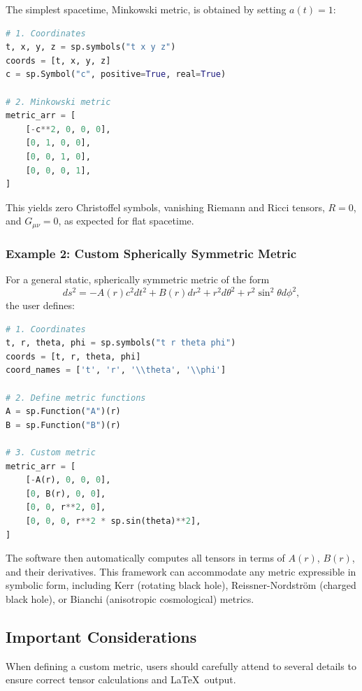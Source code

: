 \documentclass[11pt,a4paper]{article}
\begin{document}
The simplest spacetime, Minkowski metric, is obtained by setting $a(t) = 1$:

\begin{lstlisting}[language=Python]
# 1. Coordinates
t, x, y, z = sp.symbols("t x y z")
coords = [t, x, y, z]
c = sp.Symbol("c", positive=True, real=True)

# 2. Minkowski metric
metric_arr = [
    [-c**2, 0, 0, 0],
    [0, 1, 0, 0],
    [0, 0, 1, 0],
    [0, 0, 0, 1],
]
\end{lstlisting}

This yields zero Christoffel symbols, vanishing Riemann and Ricci tensors, $R = 0$, and $G_{\mu\nu} = 0$, as expected for flat spacetime.

\subsubsection*{Example 2: Custom Spherically Symmetric Metric}

For a general static, spherically symmetric metric of the form
\begin{equation}
ds^2 = -A(r) c^2 dt^2 + B(r) dr^2 + r^2 d\theta^2 + r^2 \sin^2\theta d\phi^2,
\end{equation}
the user defines:

\begin{lstlisting}[language=Python]
# 1. Coordinates
t, r, theta, phi = sp.symbols("t r theta phi")
coords = [t, r, theta, phi]
coord_names = ['t', 'r', '\\theta', '\\phi']

# 2. Define metric functions
A = sp.Function("A")(r)
B = sp.Function("B")(r)

# 3. Custom metric
metric_arr = [
    [-A(r), 0, 0, 0],
    [0, B(r), 0, 0],
    [0, 0, r**2, 0],
    [0, 0, 0, r**2 * sp.sin(theta)**2],
]
\end{lstlisting}

The software then automatically computes all tensors in terms of $A(r)$, $B(r)$, and their derivatives. This framework can accommodate any metric expressible in symbolic form, including Kerr (rotating black hole), Reissner-Nordstr\"om (charged black hole), or Bianchi (anisotropic cosmological) metrics.

\subsection{Important Considerations}

When defining a custom metric, users should carefully attend to several details to ensure correct tensor calculations and \LaTeX\ output.
\end{document}
